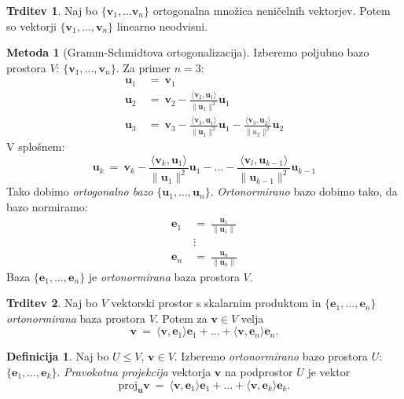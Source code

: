 \documentclass[11pt]{article}
\newcommand{\ls}{\langle}
\newcommand{\rs}{\rangle}
\renewcommand{\u}{\mathbf{u}}
\newcommand{\vv}{\mathbf{v}}
\newcommand{\e}{\mathbf{e}}
\newcommand{\0}{\mathbf{0}}
\theoremstyle{definition}
\newtheorem{definicija}{Definicija}[section]
\theoremstyle{definition}
\newtheorem{trditev}{Trditev}[section]
\theoremstyle{definition}
\theoremstyle{definition}
\newtheorem{metoda}{Metoda}[section]
\begin{document}
\begin{trditev}

Naj bo $\{\vv_1,\ldots\vv_n\}$ ortogonalna množica neničelnih vektorjev. Potem so vektorji $\{\vv_1,\ldots,\vv_n\}$ linearno neodvisni.

\end{trditev}
\vspace{0.5cm}

\begin{metoda}[Gramm-Schmidtova ortogonalizacija]

Izberemo poljubno bazo prostora $V$: $\{\vv_1,\ldots,\vv_n\}$. Za primer $n=3$:
\begin{align*}
\u_1 ~&=~ \vv_1 \\
\u_2 ~&=~ \vv_2 - \frac{\ls \vv_2, \u_1 \rs}{\|\u_1\|^2}\u_1 \\
\u_3 ~&=~ \vv_3 - \frac{\ls \vv_3, \u_1 \rs}{\|\u_1\|^2}\u_1 - \frac{\ls \vv_3, \u_2 \rs}{\|u_2\|^2}\u_2
\end{align*}
V splošnem:
$$\u_k ~=~ \vv_k - \frac{\ls \vv_k, \u_1 \rs}{\|\u_1\|^2}\u_1 - \ldots - \frac{\ls \vv_l, \u_{k-1} \rs}{\|\u_{k-1}\|^2}\u_{k-1}$$
Tako dobimo \textit{ortogonalno bazo} $\{\u_1,\ldots, \u_n\}$. \textit{Ortonormirano} bazo dobimo tako, da bazo normiramo:
\begin{align*}
\e_1 ~&=~ \frac{\u_1}{\|\u_1\|} \\
&\vdots \\
\e_n ~&=~ \frac{\u_n}{\|\u_n\|}
\end{align*}
Baza $\{\e_1,\ldots,\e_n\}$ je \textit{ortonormirana} baza prostora $V$.

\end{metoda}
\vspace{0.5cm}

\begin{trditev}

Naj bo $V$ vektorski prostor s skalarnim produktom in $\{\e_1,\ldots,\e_n\}$ \textit{ortonormirana} baza prostora $V$. Potem za $\vv \in V$ velja
$$\vv ~=~ \ls \vv,\e_1 \rs \e_1 + \ldots + \ls \vv, \e_n \rs \e_n.$$

\end{trditev}
\vspace{0.5cm}

\begin{definicija}

Naj bo $U \leq V$, $\vv \in V$. Izberemo \textit{ortonormirano} bazo prostora $U$: $\{\e_1,\ldots,\e_k\}$. \textit{Pravokotna projekcija} vektorja $\vv$ na podprostor $U$ je vektor
$$\text{proj}_\u \vv ~=~ \ls \vv,\e_1 \rs \e_1 + \ldots + \ls \vv,\e_k \rs \e_k.$$

\end{definicija}
\vspace{0.5cm}
\end{document}

